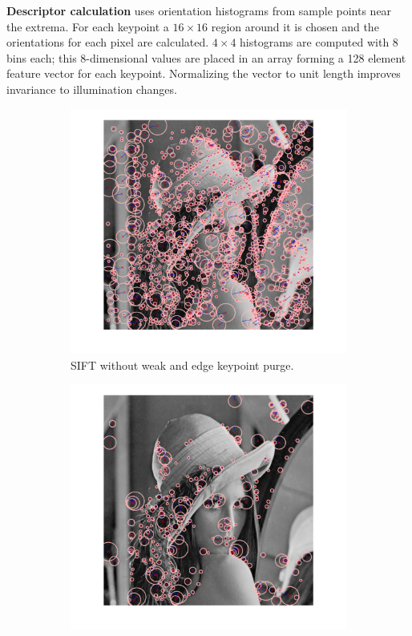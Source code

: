 \documentclass[12pt]{article}
\begin{document}
\textbf{Descriptor calculation} uses orientation histograms from sample points near the extrema.
For each keypoint a $16 \times 16$ region around it is chosen and the orientations for each pixel are calculated.
$4 \times 4$ histograms are computed with 8 bins each; this 8-dimensional values are placed in an array forming a 128 element feature vector for each keypoint.
Normalizing the vector to unit length improves invariance to illumination changes.


\begin{figure}[htbp!]
        \centering
        \begin{subfigure}[b]{0.45\textwidth}
                \includegraphics[width=\textwidth]{images/sift2}
                \caption{SIFT without weak and edge keypoint purge.}
                \label{fig:sift1}
        \end{subfigure}
        \begin{subfigure}[b]{0.45\textwidth}
                \includegraphics[width=\textwidth]{images/sift1}

\end{subfigure}
\end{figure}
\end{document}
